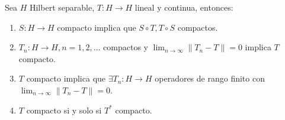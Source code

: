 \begin{theorem}
  \label{th:operator-compactness-properties}
  Sea $H$ Hilbert separable, $T:H\to H$ lineal y continua, entonces:

  \begin{enumerate}
    \item $S:H\to H$ compacto implica que $S\circ T,T\circ S$ compactos.
    \item $T_n:H\to H, n=1,2,\ldots$ compactos y $\lim_{n \to \infty}
      \|T_n-T\|=0$ implica $T$ compacto.
    \item $T$ compacto implica que $\exists T_n:H\to H$ operadores de rango
      finito con $\lim_{n \to \infty} \|T_n-T\|=0$.
    \item $T$ compacto si y solo si  $T^*$ compacto.
  \end{enumerate}
\end{theorem}

